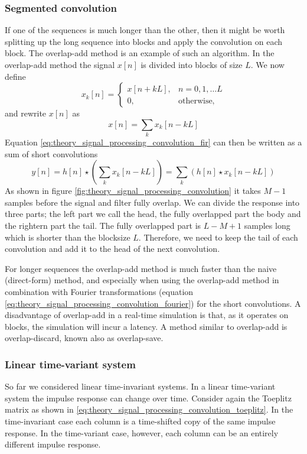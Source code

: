 \subsubsection{Segmented convolution}
If one of the sequences is much longer than the other, then it might be worth
splitting up the long sequence into blocks and apply the convolution on each
block. The overlap-add method is an example of such an algorithm. In the
overlap-add method the signal $x[n]$ is divided into blocks of size $L$. We now
define
\begin{equation}
 x_k[n] =
 \begin{cases}
  x[n+kL], & n = 0,1,\dots L \\
  0, & \text{otherwise,}
 \end{cases}
\end{equation}
and rewrite $x[n]$ as
\begin{equation}
 x[n] = \sum_k x_k[n-kL]
\end{equation}
Equation \eqref{eq:theory_signal_processing_convolution_fir} can then be written as a sum of short convolutions
\begin{equation}
y[n] = h[n] \star \left( \sum_k x_k[n-kL] \right) = \sum_k \left( h[n] \star x_k[n-kL] \right)
\end{equation}
As shown in figure \ref{fig:theory_signal_processing_convolution} it takes $M-1$
samples before the signal and filter fully overlap. We can divide the response
into three parts; the left part we call the head, the fully overlapped part the
body and the rightern part the tail. The fully overlapped part is $L-M+1$
samples long which is shorter than the blocksize $L$. Therefore, we need to keep
the tail of each convolution and add it to the head of the next convolution.

For longer sequences the overlap-add method is much faster than the naive
(direct-form) method, and especially when using the overlap-add method in
combination with Fourier transformations (equation
\eqref{eq:theory_signal_processing_convolution_fourier}) for the short
convolutions. A disadvantage of overlap-add in a real-time simulation is that,
as it operates on blocks, the simulation will incur a latency.
A method similar to overlap-add is overlap-discard, known also as overlap-save.

\subsubsection{Linear time-variant system}
So far we considered linear time-invariant systems. In a linear time-variant
system the impulse response can change over time. Consider again the Toeplitz
matrix as shown in \eqref{eq:theory_signal_processing_convolution_toeplitz}. In
the time-invariant case each column is a time-shifted copy of the same impulse
response. In the time-variant case, however, each column can be an entirely
different impulse response.

